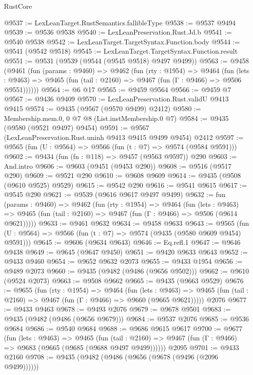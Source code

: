 \begin{lexlean}{RustCore}
\begin{coremodule}
@9537 := LexLeanTarget.RustSemantics.fallibleType
@9538 := @9537 @9494
@9539 := @9536 @9538
@9540 := LexLeanPreservation.Rust.Jd.b
@9541 := @9540 @9538
@9542 := LexLeanTarget.TargetSyntax.Function.body
@9544 := @9541 (@9542 @9518)
@9545 := LexLeanTarget.TargetSyntax.Function.result
@9551 := @9531 (@9539 (@9544 (@9545 @9518) @9497 @9499))
@9563 := @9458
    (@9461
      (fun (params : @9460) =>
      @9462
        (fun (rty : @1954) =>
        @9464
          (fun (lets : @9463) =>
          @9465 (fun (tail : @2160) => @9467 (fun (Γ : @9466) => @9506 @9551))))))
@9564 := @6 @17
@9565 := @9459 @9564
@9566 := @9459 @7
@9567 := @9436 @9409
@9570 := LexLeanPreservation.Rust.validU @9413 @9415
@9574 := @9435 (@9567 (@9570 @9499) @2412)
@9580 := Membership.mem.{0, 0} @7 @8 (List.instMembership.{0} @7)
@9584 := @9435 (@9580 (@9521 @9497) @9454)
@9591 := @9567 (LexLeanPreservation.Rust.uninh @9413 @9415 @9499 @9454) @2412
@9597 := @9565 (fun (U : @9564) => @9566 (fun (t : @7) => @9574 (@9584 @9591)))
@9602 := @9434 (fun (fn : @118) => @9457 (@9563 @9597)) @290
@9603 := And.intro
@9606 := @9603 (@9451 (@9453 @290))
@9608 := @9516 (@9517 @290)
@9609 := @9521 @290
@9610 := @9608 @9609
@9614 := @9435 (@9508 (@9610 @9525) @9529)
@9615 := @9542 @290
@9616 := @9541 @9615
@9617 := @9545 @290
@9621 := @9539 (@9616 @9617 @9497 @9499)
@9632 := fun (params : @9460) =>
  @9462
    (fun (rty : @1954) =>
    @9464
      (fun (lets : @9463) =>
      @9465 (fun (tail : @2160) => @9467 (fun (Γ : @9466) => @9506 (@9614 @9621)))))
@9633 := @9461 @9632
@9634 := @9458 @9633
@9643 := @9565 (fun (U : @9564) => @9566 (fun (t : @7) => @9574 (@9435 (@9580 @9609 @9454) @9591)))
@9645 := @9606 (@9634 @9643)
@9646 := Eq.refl.{1}
@9647 := @9646 @9438
@9649 := @9645 (@9647 @9450)
@9651 := @9420 @9633 @9643
@9652 := @9433 @9460
@9654 := @9652 @9632 @2073
@9655 := @9433 @1954
@9656 := @9489 @2073
@9660 := @9435 (@9482 (@9486 (@9656 @9502)))
@9662 := @9610 (@9524 @2073)
@9663 := @9508 @9662
@9665 := @9435 (@9663 @9529)
@9676 := @9655
    (fun (rty : @1954) =>
    @9464
      (fun (lets : @9463) =>
      @9465 (fun (tail : @2160) => @9467 (fun (Γ : @9466) => @9660 (@9665 @9621)))))
    @2076
@9677 := @9433 @9463
@9678 := @9493 @2076
@9679 := @9678 @9501
@9683 := @9435 (@9482 (@9486 (@9656 @9679)))
@9684 := @9537 @2076
@9685 := @9536 @9684
@9686 := @9540 @9684
@9688 := @9686 @9615 @9617
@9700 := @9677
    (fun (lets : @9463) =>
    @9465
      (fun (tail : @2160) => @9467 (fun (Γ : @9466) => @9683 (@9665 (@9685 (@9688 @9497 @9499))))))
    @2095
@9701 := @9433 @2160
@9708 := @9435 (@9482 (@9486 (@9656 (@9678 (@9496 (@2096 @9499))))))

\end{coremodule}
\end{lexlean}
